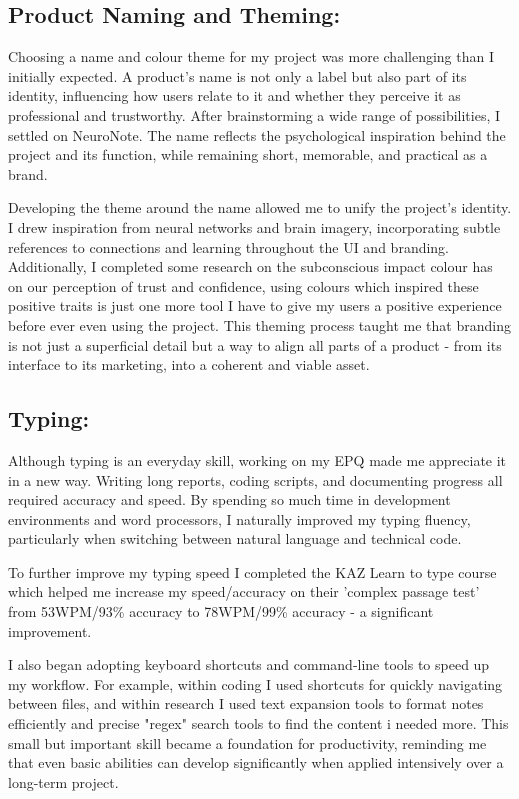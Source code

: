 \subsection{Product Naming and Theming:}

Choosing a name and colour theme for my project was more challenging than I initially expected. A product's name is not only a label but also part of its identity, influencing how users relate to it and whether they perceive it as professional and trustworthy. After brainstorming a wide range of possibilities, I settled on NeuroNote. The name reflects the psychological inspiration behind the project and its function, while remaining short, memorable, and practical as a brand.

Developing the theme around the name allowed me to unify the project's identity. I drew inspiration from neural networks and brain imagery, incorporating subtle references to connections and learning throughout the UI and branding. Additionally, I completed some research on the subconscious impact colour has on our perception of trust and confidence,  using colours which inspired these positive traits is just one more tool I have to give my users a positive experience before ever even using the project. This theming process taught me that branding is not just a superficial detail but a way to align all parts of a product - from its interface to its marketing, into a coherent and viable asset. 

\subsection{Typing:}

Although typing is an everyday skill, working on my EPQ made me appreciate it in a new way. Writing long reports, coding scripts, and documenting progress all required accuracy and speed. By spending so much time in development environments and word processors, I naturally improved my typing fluency, particularly when switching between natural language and technical code.

To further improve my typing speed I completed the KAZ Learn to type course which helped me increase my speed/accuracy on their 'complex passage test' from 53WPM/93\% accuracy to 78WPM/99\% accuracy - a significant improvement.

I also began adopting keyboard shortcuts and command-line tools to speed up my workflow. For example, within coding I used shortcuts for quickly navigating between files, and within research I used text expansion tools to format notes efficiently and precise "regex" search tools to find the content i needed more. This small but important skill became a foundation for productivity, reminding me that even basic abilities can develop significantly when applied intensively over a long-term project.
